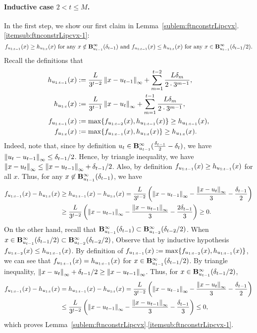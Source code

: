 \paragraph{Inductive case $2<t \leq M$.}
In the first step, we show our first claim in Lemma~\ref{sublem:ftnconstrLipcvx}.\ref{itemsub:ftnconstrLipcvx-1}: 
\begin{equation*}
f_{u_{1:{t-1}}}(x) \geq h_{u_{1:{t}}} (x) ~\text{for any $x\notin \mathbf{B}^\infty_{u_{t-1}}({\delta_{t-1}})$ and } 
f_{u_{1:{t-1}}}(x) \leq h_{u_{1:{t}}} (x) ~\text{for any $x\in \mathbf{B}^\infty_{u_{t-1}}({\delta_{t-1}/2})$}.
\end{equation*}
Recall the definitions that
\begin{align*}
h_{u_{1:{t-1}}} (x) &:= \frac{L}{3^{t-2}} \left\|{x-u_{t-1}}\right\|_\infty + \sum_{m=1}^{t-2} \frac{L \delta_m}{2 \cdot 3^{m-1}},\\
h_{u_{1:{t}}} (x) &:= \frac{L}{3^{t-1}} \left\|{x-u_{t}}\right\|_\infty + \sum_{m=1}^{t-1} \frac{L \delta_m}{2 \cdot 3^{m-1}},\\
f_{u_{1:{t-1}}} (x) &:= \max \{ f_{u_{1:{t-2}}} (x), h_{u_{1:{t-1}}} (x) \} \geq  h_{u_{1:{t-1}}} (x),\\
f_{u_{1:{t}}} (x) &:= \max \{ f_{u_{1:{t-1}}} (x), h_{u_{1:{t}}} (x) \} \geq  h_{u_{1:{t}}} (x).
\end{align*}
Indeed, note that, since by definition $u_t \in \mathbf{B}^\infty_{u_{t-1}}({\tfrac{\delta_{t-1}}{2}-\delta_t})$,
we have $\left\|{u_t - u_{t-1}}\right\|_\infty \leq \delta_{t-1}/2$.
Hence, by triangle inequality, we have $\left\|{x-u_t}\right\|_\infty \leq \left\|{x-u_{t-1}}\right\|_\infty + \delta_{t-1}/2$. 
Also, by definition $f_{u_{1:{t-1}}}(x) \geq h_{u_{1:{t-1}}}(x)$ for all $x$.
Thus, for any $x\not\in \mathbf{B}^\infty_{u_{t-1}}({\delta_{t-1}})$, we have
\begin{align*}
f_{u_{1:{t-1}}}(x) - h_{u_{1:{t}}}(x) 
&\geq h_{u_{1:{t-1}}}(x)- h_{u_{1:{t}}}(x) 
= \frac{L}{3^{t-2}} \left(\left\|{x-u_{t-1}}\right\|_\infty - \frac{\left\|{x-u_t}\right\|_\infty}{3} - \frac{\delta_{t-1}}{2}\right) \\
&\geq \frac{L}{3^{t-2}} \left(\left\|{x-u_{t-1}}\right\|_\infty - \frac{\left\|{x-u_{t-1}}\right\|_\infty}{3} - \frac{2\delta_{t-1}}{3}\right) 
\geq 0.
\end{align*}
On the other hand, recall that $\mathbf{B}^\infty_{u_{t-1}}({\delta_{t-1}}) \subset \mathbf{B}^\infty_{u_{t-2}}({\delta_{t-2}/2})$.
When $x \in \mathbf{B}^\infty_{u_{t-1}}({\delta_{t-1}/2}) \subset \mathbf{B}^\infty_{u_{t-2}}({\delta_{t-2}/2})$,
Observe that by inductive hypothesis $f_{u_{1:{t-2}}}(x) \leq h_{u_{1:{t-1}}} (x)$.
By definition of $f_{u_{1:{t-1}}} (x) := \max \{ f_{u_{1:{t-2}}} (x), h_{u_{1:{t-1}}} (x) \}$,
we can see that $f_{u_{1:{t-1}}} (x) = h_{u_{1:{t-1}}} (x)$ for $x \in \mathbf{B}^\infty_{u_{t-1}}({\delta_{t-1}/2})$.
By triangle inequality, $\left\|{x-u_{t}}\right\|_\infty +  \delta_{t-1}/2 \geq \left\|{x-u_{t-1}}\right\|_\infty$.
Thus, for $x\in \mathbf{B}^\infty_{u_{t-1}}({\delta_{t-1}/2})$,
\begin{align*}
f_{u_{1:{t-1}}}(x) - h_{u_{1:{t}}}(x)  
&= h_{u_{1:{t-1}}}(x) -  h_{u_{1:{t}}}(x) 
= \frac{L}{3^{t-2}} \left(\left\|{x-u_{t-1}}\right\|_\infty - \frac{\left\|{x-u_t}\right\|_\infty}{3} - \frac{\delta_{t-1}}{2}\right) \\
&\leq  \frac{L}{3^{t-2}} \left(\left\|{x-u_{t-1}}\right\|_\infty - \frac{\left\|{x-u_{t-1}}\right\|_\infty}{3} -
\frac{\delta_{t-1}}{3}\right) \leq 0, 
\end{align*}
which proves Lemma~\ref{sublem:ftnconstrLipcvx}.\ref{itemsub:ftnconstrLipcvx-1}. 

